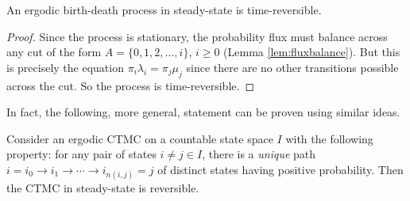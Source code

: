 \documentclass[a4paper,10pt,english]{article}
\begin{document}
\begin{prop}
An ergodic birth-death process in steady-state is time-reversible.
\end{prop}
\begin{proof}
Since the process is stationary, the probability flux must balance across any cut of the form $A = \{0, 1, 2, \ldots, i\}$, $i \geq 0$ (Lemma \ref{lem:fluxbalance}). But this is precisely the equation $\pi_i \lambda_i = \pi_j \mu_j$ since there are no other transitions possible across the cut. So the process is time-reversible. 
\end{proof}

In fact, the following, more general, statement can be proven using similar ideas. 

\begin{prop}
Consider an ergodic CTMC on a countable state space $I$ with the following property: for any pair of states $i \neq j \in I$, there is a {\em unique} path $i = i_0 \to i_1 \to \cdots \to i_{n(i,j)} = j$ of distinct states having positive probability. Then the CTMC in steady-state is reversible. 
\end{prop}
\end{document}
